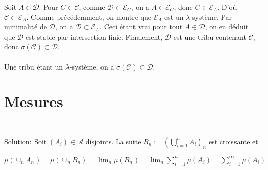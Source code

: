 \documentclass{report}
\begin{document}
Soit $A\in \mathcal D$. Pour $C\in \mathcal C$, comme $\mathcal D\subset \mathcal E_C$, on a $A\in \mathcal E_C$, donc $C\in \mathcal E_A$. D'où $\mathcal C \subset \mathcal E_A$. Comme précédemment, on montre que $\mathcal E_A$ est un $\lambda$-système. Par minimalité de $\mathcal D$, on a $\mathcal D \subset \mathcal E_A$.\newline
Ceci étant vrai pour tout $A\in \mathcal D$, on en déduit que $\mathcal D$ est stable par intersection finie.\newline
Finalement, $\mathcal D$ est une tribu contenant $\mathcal C$, donc $\sigma(\mathcal C)\subset \mathcal D$. \\\\
\fbox{$\supset$} Une tribu étant un $\lambda$-système, on a $\sigma(\mathcal C) \subset \mathcal D$.

\newpage
\section{Mesures}

\subsection{}  \\

Solution: Soit $(A_i)\in \mathcal A$ disjoints. La suite $\displaystyle B_n:=\left( \bigcup_{i=1}^n A_i\right)_n$ est croissante et \newline
\centerline{$\mu(\cup_n A_n) = \mu(\cup_n B_n)=\lim_n \mu(B_n)=\lim_n \sum_{i=1}^n \mu(A_i) = \sum_{i=1}^{\infty} \mu(A_i)$}

\subsection{}  \\
\end{document}

